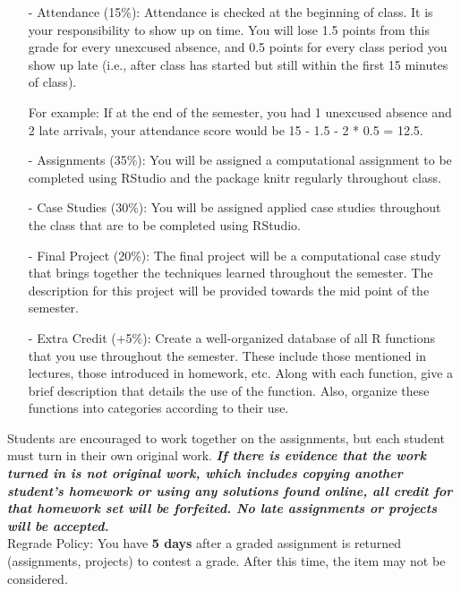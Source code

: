 \documentclass[10pt, oneside]{article}
\begin{document}
\begin{itemize}
	\item[-] Attendance (15\%): Attendance is checked at the beginning of class. It is your responsibility to show up on time. You will lose 1.5 points from this grade for every unexcused absence, and 0.5 points for every class period you show up late (i.e., after class has started but still within the first 15 minutes of class). 
	
	For example: If at the end of the semester, you had 1 unexcused absence and 2 late arrivals, your attendance score would be 15 - 1.5 - 2 * 0.5 = 12.5.
	\item[-] Assignments (35\%): You will be assigned a computational assignment to be completed using RStudio and the package knitr regularly throughout class.
	\item[-] Case Studies (30\%): You will be assigned applied case studies throughout the class that are to be completed using RStudio.
	\item[-] Final Project (20\%): The final project will be a computational case study that brings together the techniques learned throughout the semester. The description for this project will be provided towards the mid point of the semester.
	\item[-] Extra Credit (+5\%): Create a well-organized database of all R functions that you use throughout the semester. These include those mentioned in lectures, those introduced in homework, etc. Along with each function, give a brief description that details the use of the function. Also, organize these functions into categories according to their use.
\end{itemize}

Students are encouraged to work together on the assignments, but each student must turn in their own original work.\textit{ \textbf{ If there is evidence that the work turned in is not original work, which includes copying another student's homework or using any solutions found online, all credit for that homework set will be forfeited. No late assignments or projects will be accepted.}}\\

Regrade Policy: You have \textbf{5 days} after a graded assignment is returned (assignments, projects) to contest a grade.  After this time, the item may not be considered. 

\newpage
\thispagestyle{empty}
\end{document}
